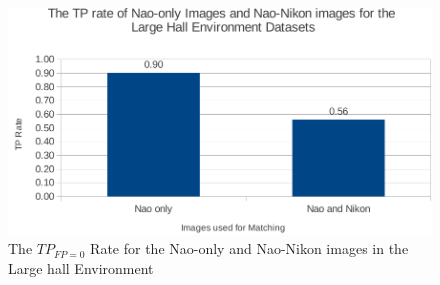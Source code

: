 \documentclass{report}
\begin{document}
\begin{figure}[h!] 
  \centering
    \includegraphics[width=1.0\textwidth]{../Drawings/Graphs/tp_rate_nikon_lh.pdf}
    \caption{The $TP_{FP=0}$ Rate for the Nao-only and Nao-Nikon images in the Large hall Environment}
    \label{fig:tp_rate_nikon_lh}
\end{figure}

\end{document}
